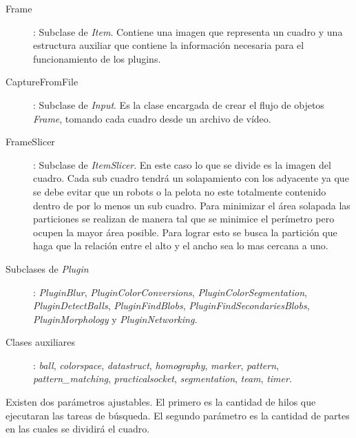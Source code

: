 \begin{description}

\item[Frame]: Subclase de \emph{Item}. Contiene una imagen que representa un
	cuadro y una estructura auxiliar que contiene la información necesaria
	para el funcionamiento de los plugins.

\item[CaptureFromFile]: Subclase de \emph{Input}. Es la clase encargada de crear
	el flujo de objetos \emph{Frame}, tomando cada cuadro desde un archivo
	de vídeo.

\item[FrameSlicer]: Subclase de \emph{ItemSlicer}. En este caso lo que se divide
	es la imagen del cuadro. Cada sub cuadro tendrá un solapamiento con los
	adyacente ya que se debe evitar que un robots o la pelota no este
	totalmente contenido dentro de por lo menos un sub cuadro. Para
	minimizar el área solapada las particiones se realizan de manera tal que
	se minimice el perímetro pero ocupen la mayor área posible. Para lograr
	esto se busca la partición que haga que la relación entre el alto y el
	ancho sea lo mas cercana a uno.

\item[Subclases de \emph{Plugin}]: \emph{PluginBlur},
	\emph{PluginColorConversions}, \emph{PluginColorSegmentation},
	\emph{PluginDetectBalls}, \emph{PluginFindBlobs},
	\emph{PluginFindSecondariesBlobs}, \emph{PluginMorphology} y
	\emph{PluginNetworking}.

\item[Clases auxiliares]: \emph{ball}, \emph{colorspace}, \emph{datastruct},
	\emph{homography}, \emph{marker}, \emph{pattern},
	\emph{pattern\_matching}, \emph{practicalsocket}, \emph{segmentation},
	\emph{team}, \emph{timer}.

\end{description}

Existen dos parámetros ajustables. El primero es la cantidad de hilos que
ejecutaran las tareas de búsqueda. El segundo parámetro es la cantidad de partes
en las cuales se dividirá el cuadro.
